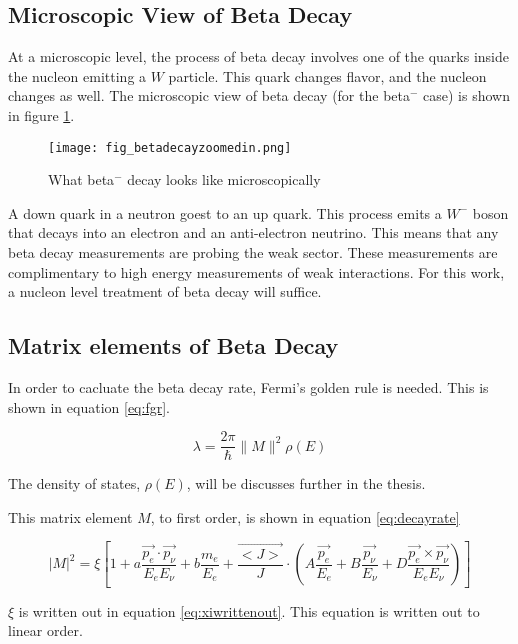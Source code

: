 \documentclass[main.tex]{subfiles}
\begin{document}
\subsection{Microscopic View of Beta Decay}
At a microscopic level, the process of beta decay involves one of the quarks inside the nucleon emitting a $W$ particle.
This quark changes flavor, and the nucleon changes as well. 
The microscopic view of beta decay (for the beta$^{-}$ case) is shown in figure \ref{fig:betadecaymicro}.

\begin{figure}[!htb]
	\centerline{\texttt{[image: fig\_betadecayzoomedin.png]}}
	\caption{What beta$^{-}$ decay looks like microscopically}
	\label{fig:betadecaymicro}
\end{figure}

A down quark in a neutron goest to an up quark.
This process emits a $W^{-}$ boson that decays into an electron and an anti-electron neutrino.
This means that any beta decay measurements are probing the weak sector. 
These measurements are complimentary to high energy measurements of weak interactions.
For this work, a nucleon level treatment of beta decay will suffice.  

\subsection{Matrix elements of Beta Decay}
In order to cacluate the beta decay rate, Fermi's golden rule is needed.
This is shown in equation \ref{eq:fgr}.

\begin{equation}
	\lambda = \frac{2\pi}{\hbar}\|M\|^{2}\rho(E)
	\label{eq:fgr}
\end{equation}

The density of states, $\rho(E)$, will be discusses further in the thesis. 

This matrix element $M$, to first order, is shown in equation \ref{eq:decayrate} \cite{Gon19}

\begin{equation}
	|M|^{2} = \xi [1 + a \frac{\vec{p_{e}} \cdot \vec{p_{\nu}}} {E_{e} E_{\nu}}  +  b \frac{m_{e}}{E_{e}} + \frac{\vec{<J>}}{J} \cdot (A \frac{ \vec{p_{e}} }{E_{e}} + B \frac{\vec{p_{\nu}}}{E_{\nu}} + D \frac{\vec{p_{e}} \times \vec{p_{\nu}}}{E_{e} E_{\nu}})]
	\label{eq:decayrate}
\end{equation}

$\xi$ is written out in equation \ref{eq:xiwrittenout}. 
This equation is written out to linear order.
 
\end{document}

